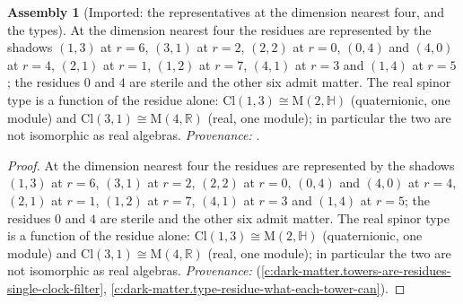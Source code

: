 \documentclass[11pt]{article}
\theoremstyle{definition}
\newtheorem{assembled}[theorem]{Assembly}
\theoremstyle{plain}
\newcommand{\changedmark}[2]{\marginpar{\raggedright\scriptsize\color{#1}#2}}
\providecommand{\Cl}{}\renewcommand{\Cl}{\mathrm{Cl}}
\providecommand{\HH}{}\renewcommand{\HH}{\mathbb{H}}
\providecommand{\Mat}{}\renewcommand{\Mat}{\mathrm{M}}
\providecommand{\R}{}\renewcommand{\R}{\mathbb{R}}
\begin{document}
\begin{assembled}[Imported: the representatives at the dimension nearest four, and the types]\label{c:odd-extensions.imported-representatives-dimension-nearest-four-types}
\changedmark{BrickRed}{corrected since the deposit}
At the dimension nearest four the residues are represented by the shadows $(1,3)$ at $r = 6$, $(3,1)$ at $r = 2$, $(2,2)$ at $r = 0$, $(0,4)$ and $(4,0)$ at $r = 4$, $(2,1)$ at $r = 1$, $(1,2)$ at $r = 7$, $(4,1)$ at $r = 3$ and $(1,4)$ at $r = 5$; the residues $0$ and $4$ are sterile and the other six admit matter. The real spinor type is a function of the residue alone: $\Cl(1,3) \cong \Mat(2,\HH)$ (quaternionic, one module) and $\Cl(3,1) \cong \Mat(4,\R)$ (real, one module); in particular the two are not isomorphic as real algebras. \emph{Provenance:} \cite[Prop.~3.1, Thm.~3.4]{ButlerT14}.
\end{assembled}
\begin{proof}
At the dimension nearest four the residues are represented by the shadows $(1,3)$ at $r = 6$, $(3,1)$ at $r = 2$, $(2,2)$ at $r = 0$, $(0,4)$ and $(4,0)$ at $r = 4$, $(2,1)$ at $r = 1$, $(1,2)$ at $r = 7$, $(4,1)$ at $r = 3$ and $(1,4)$ at $r = 5$; the residues $0$ and $4$ are sterile and the other six admit matter. The real spinor type is a function of the residue alone: $\Cl(1,3) \cong \Mat(2,\HH)$ (quaternionic, one module) and $\Cl(3,1) \cong \Mat(4,\R)$ (real, one module); in particular the two are not isomorphic as real algebras. \emph{Provenance:} \cite[Prop.~3.1, Thm.~3.4]{ButlerT14} (\ref{c:dark-matter.towers-are-residues-single-clock-filter}, \ref{c:dark-matter.type-residue-what-each-tower-can}).

\end{proof}
\end{document}
